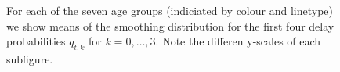 \begin{figure}
   \resizebox{\textwidth}{!}{%
        
}
    \caption{For each of the seven age groups (indiciated by colour and linetype) we show means of the smoothing distribution for the first four delay probabilities $q_{t, k}$ for $k = 0, \dots, 3$. Note the differen y-scales of each subfigure.}
    \label{fig:hospitalization_showcase_results_delay_distribution}
\end{figure}
